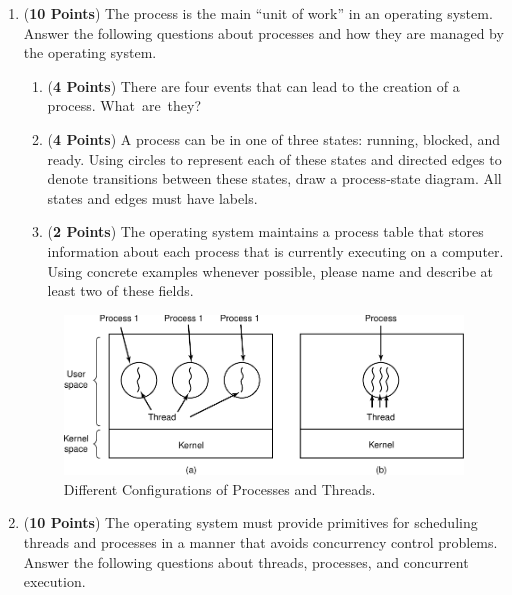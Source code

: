 \documentclass[12pt,epsf,psfig,graphics]{article}
\begin{document}
\begin{enumerate}
\begin{enumerate}
  \end{enumerate}

  \newpage
  
\item ({\bf 10 Points}) The process is the main ``unit of work'' in an operating system.  Answer the following questions
  about processes and how they are managed by the operating system.

  \begin{enumerate}

    \item ({\bf 4 Points}) There are four events that can lead to the creation of a process. \mbox{What are they}?

    \item ({\bf 4 Points}) A process can be in one of three states: running, blocked, and ready. Using circles to
      represent each of these states and directed edges to denote transitions between these states, draw a process-state
      diagram. All states and edges must have labels.

    \item ({\bf 2 Points}) The operating system maintains a process table that stores information about each process
      that is currently executing on a computer. Using concrete examples whenever possible, please name and describe at
      least two of these fields.

  \end{enumerate}

  \newpage

  \begin{figure}[t]
    \centering
    \includegraphics{fig2-11}
    \caption{Different Configurations of Processes and Threads.}
    \label{fig:pandt}
  \end{figure}


\item ({\bf 10 Points}) The operating system must provide primitives for scheduling threads and processes in a manner
  that avoids concurrency control problems. Answer the following questions about threads, processes, and concurrent
  execution.


\end{enumerate}
\end{document}
